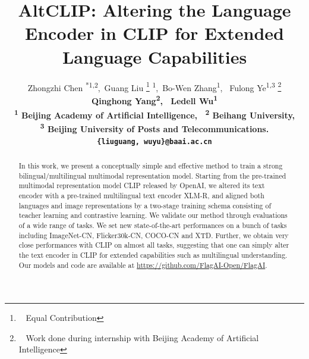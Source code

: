 \documentclass[11pt,a4paper]{article}
\date{}
\title{AltCLIP: Altering the Language Encoder in CLIP for Extended Language Capabilities}
\author{
Zhongzhi Chen \textsuperscript{*1,2\dag},\
Guang Liu  \thanks{~ Equal Contribution} \textsuperscript{ 1},\
Bo-Wen Zhang\textsuperscript{1}, \
Fulong Ye\textsuperscript{1,3\dag} \thanks{~ Work done during internship with Beijing Academy of Artificial Intelligence} \\
\bf{Qinghong Yang\textsuperscript{2}, \
Ledell Wu\textsuperscript{1}}  \\
\textsuperscript{1} Beijing Academy of Artificial Intelligence, \
\textsuperscript{2} Beihang University, \\
\textsuperscript{3} Beijing University of Posts and Telecommunications.\\
\texttt{\{liuguang, wuyu\}@baai.ac.cn} 
}
\begin{document}
\maketitle
\begin{abstract}
In this work, we present a conceptually simple and effective method to train a strong bilingual/multilingual multimodal representation model. Starting from the pre-trained multimodal representation model CLIP released by OpenAI, we altered its text encoder with a pre-trained multilingual text encoder XLM-R, and aligned both languages and image representations by a two-stage training schema consisting of teacher learning and contrastive learning. We validate our method through evaluations of a wide range of tasks. We set new state-of-the-art performances on a bunch of tasks including ImageNet-CN, Flicker30k-CN, COCO-CN and XTD. Further, we obtain very close performances with CLIP on almost all tasks, suggesting that one can simply alter the text encoder in CLIP for extended capabilities such as multilingual understanding. Our models and code are available at \url{https://github.com/FlagAI-Open/FlagAI}.

\end{abstract}









%


\appendix

\end{document}
